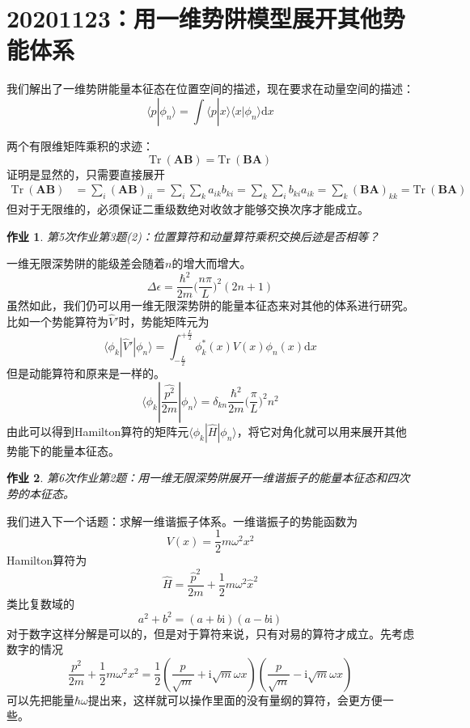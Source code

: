 \documentclass[12pt]{article}
\newtheorem{asg}{作业}
\begin{document}
    \section{20201123：用一维势阱模型展开其他势能体系}

    我们解出了一维势阱能量本征态在位置空间的描述，现在要求在动量空间的描述：
    \[ \langle p|\phi_n \rangle = \int \langle p|x \rangle \langle x |\phi_n \rangle \mathrm{d}x \]

    两个有限维矩阵乘积的求迹：
    \begin{equation*}
        \mathrm{Tr} \ (\bm{AB}) = \mathrm{Tr} \ (\bm{BA})
    \end{equation*}
    证明是显然的，只需要直接展开
    \begin{align*}
        \mathrm{Tr} \ (\bm{AB}) &= \sum_i (\bm{AB})_{ii}
        = \sum_i \sum_k a_{ik}b_{ki}
        = \sum_k \sum_i b_{ki}a_{ik}
        = \sum_k \bm{(BA)}_{kk}
        = \mathrm{Tr} \ (\bm{BA})
    \end{align*}
    但对于无限维的，必须保证二重级数绝对收敛才能够交换次序才能成立。
    \begin{asg}
        第5次作业第3题(2)：位置算符和动量算符乘积交换后迹是否相等？
    \end{asg}

    一维无限深势阱的能级差会随着$n$的增大而增大。
    \[ \Delta \epsilon = \frac {\hbar^2}{2m} \bigg(\frac {n\pi}L \bigg)^2 (2n+1) \]
    虽然如此，我们仍可以用一维无限深势阱的能量本征态来对其他的体系进行研究。比如一个势能算符为$\hat{V}'$时，势能矩阵元为
    \[
        \langle \phi_k | \hat{V}' | \phi_n \rangle = \int_{-\frac L2}^{+\frac L2} \phi_k^*(x) V(x) \phi_n(x) \mathrm{d}x 
    \]
    但是动能算符和原来是一样的。
    \[
        \langle \phi_k | \frac {\hat{p^2}}{2m} | \phi_n \rangle = \delta_{kn} \frac {\hbar^2}{2m} \bigg( \frac {\pi}L \bigg)^2 n^2
    \]
    由此可以得到Hamilton算符的矩阵元$\langle \phi_k | \hat{H} | \phi_n \rangle$，将它对角化就可以用来展开其他势能下的能量本征态。
    \begin{asg}
        第6次作业第2题：用一维无限深势阱展开一维谐振子的能量本征态和四次势的本征态。
    \end{asg}

    我们进入下一个话题：求解一维谐振子体系。一维谐振子的势能函数为
    \[ V(x) = \frac 12 m\omega^2x^2 \]
    Hamilton算符为
    \[ \hat{H} = \frac {\hat{p}^2}{2m} + \frac 12 m\omega^2 \hat{x}^2 \]
    类比复数域的
    \[ a^2 + b^2 = (a+b\mathrm{i})(a-b\mathrm{i}) \]
    对于数字这样分解是可以的，但是对于算符来说，只有对易的算符才成立。先考虑数字的情况
    \[ \frac {p^2}{2m} + \frac 12 m\omega^2 x^2 = \frac 12 (\frac p{\sqrt{m}} + \mathrm{i}\sqrt{m}\omega x)(\frac p{\sqrt{m}} - \mathrm{i}\sqrt{m}\omega x) \]
    可以先把能量$\hbar \omega$提出来，这样就可以操作里面的没有量纲的算符，会更方便一些。
\end{document}
